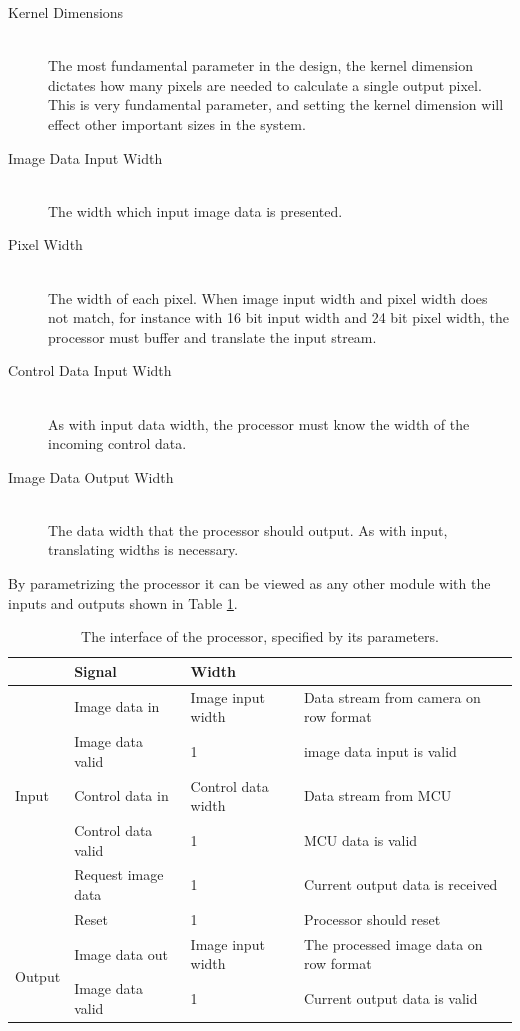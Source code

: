 \begin{description}
    \item[Kernel Dimensions] \hfill \\
        The most fundamental parameter in the design, the kernel dimension dictates how many pixels are needed to calculate a single output pixel.
        This is very fundamental parameter, and setting the kernel dimension will effect other important sizes in the system.
    \item[Image Data Input Width] \hfill \\
        The width which input image data is presented.
    \item[Pixel Width] \hfill \\
        The width of each pixel. When image input width and pixel width does not match, for instance with 16 bit input width and 24 bit pixel width, the processor must buffer and translate the input stream.
    \item[Control Data Input Width] \hfill \\
        As with input data width, the processor must know the width of the incoming control data.
    \item[Image Data Output Width] \hfill \\
        The data width that the processor should output. As with input, translating widths is necessary.
\end{description}

By parametrizing the processor it can be viewed as any other module with the inputs and outputs shown in Table \ref{tbl:ConvolutionEngineIO}.

\begin{table}[h]
    \begin{tabular}{l | l | l | l }
        &   Signal & Width\\
        \hline
        \multirow{5}{*}{Input}
        &   Image data in           & Image input width     & Data stream from camera on row format
        \\
        &   Image data valid        & 1                     & image data input is valid
        \\
        &   Control data in         & Control data width    & Data stream from MCU
        \\
        &   Control data valid      & 1                     & MCU data is valid
        \\
        &   Request image data      & 1                     & Current output data is received
        \\
        &   Reset                   & 1                     & Processor should reset
        \\\hline
        \multirow{2}{*}{Output}
        &   Image data out          & Image input width     & The processed image data on row format\\
        &   Image data valid        & 1                     & Current output data is valid
    \end{tabular}
    \caption{The interface of the processor, specified by its parameters.}
    \label{tbl:ConvolutionEngineIO}
\end{table}

